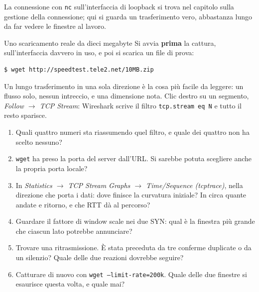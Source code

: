 La connessione con \texttt{nc} sull'interfaccia di loopback si trova nel capitolo sulla gestione della connessione;
qui si guarda un trasferimento vero, abbastanza lungo da far vedere le finestre al lavoro.

\begin{esercizio}{Uno scaricamento reale da dieci megabyte}
Si avvia \textbf{prima} la cattura, sull'interfaccia davvero in uso, e poi si scarica un file di prova:
\begin{lstlisting}[language=bash]
$ wget http://speedtest.tele2.net/10MB.zip
\end{lstlisting}
Un lungo trasferimento in una sola direzione è la cosa più facile da
leggere: un flusso solo, nessun intreccio, e una dimensione nota. Clic destro su un segmento, \emph{Follow $\rightarrow$
TCP Stream}: Wireshark scrive il filtro \texttt{tcp.stream eq N} e tutto il resto sparisce.
\begin{enumerate}[label=(\alph*)]
    \item Quali quattro numeri sta riassumendo quel filtro, e quale dei quattro non ha scelto nessuno?
    \item \texttt{wget} ha preso la porta del server dall'URL. Si sarebbe potuta scegliere anche la propria porta locale?
    \item In \emph{Statistics $\rightarrow$ TCP Stream Graphs $\rightarrow$ Time/Sequence (tcptrace)}, nella direzione che
          porta i dati: dove finisce la curvatura iniziale? In circa quante andate e ritorno, e che RTT dà al percorso?
    \item Guardare il fattore di window scale nei due SYN: qual è la finestra più grande che ciascun lato potrebbe annunciare?
    \item Trovare una ritrasmissione. È stata preceduta da tre conferme duplicate o da un silenzio? Quale delle due reazioni
          dovrebbe seguire?
    \item Catturare di nuovo con \texttt{wget --limit-rate=200k}. Quale delle due finestre si esaurisce questa volta, e quale
          mai?
\end{enumerate}


\end{esercizio}
